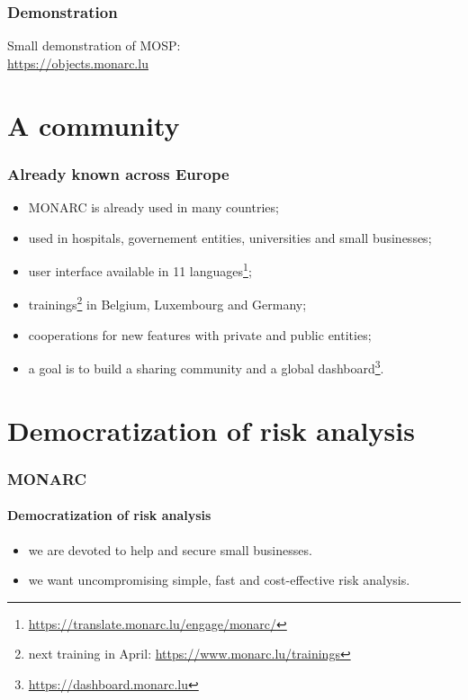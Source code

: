 \documentclass[]{beamer}
\begin{document}
\begin{frame}
  \frametitle{Demonstration}
  Small demonstration of MOSP:\\
  \url{https://objects.monarc.lu}
\end{frame}


\section{A community}
\begin{frame}
  \frametitle{Already known across Europe}
  \begin{center}
    \begin{itemize}
      \item MONARC is already used in many countries;
      \item used in hospitals, governement entities, universities and small businesses;
      \item user interface available in 11 languages\footnote{\url{https://translate.monarc.lu/engage/monarc/}};
      \item trainings\footnote{next training in April: \url{https://www.monarc.lu/trainings}} in Belgium, Luxembourg and Germany;
      \item cooperations for new features with private and public entities;
      \item a goal is to build a sharing community and a global dashboard\footnote{\url{https://dashboard.monarc.lu}}.
    \end{itemize}
  \end{center}
\end{frame}


\section{Democratization of risk analysis}
\begin{frame}
  \frametitle{MONARC}
  \framesubtitle{Democratization of risk analysis}
  \begin{center}
    \begin{itemize}
      \item we are devoted to help and secure small businesses.
      \item we want uncompromising simple, fast and cost-effective risk analysis.
    \end{itemize}
  \end{center}
\end{frame}
\end{document}
